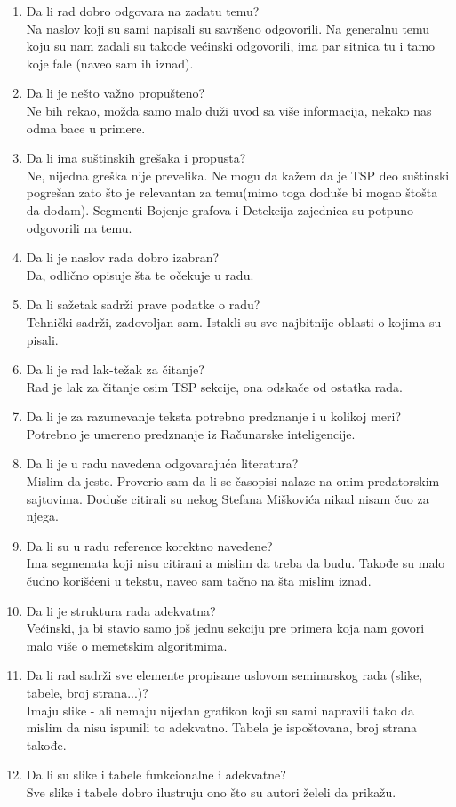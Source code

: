 \documentclass[a4paper]{report}
\begin{document}
\begin{enumerate}
\item Da li rad dobro odgovara na zadatu temu?\\ Na naslov koji su sami napisali su savršeno odgovorili. Na generalnu temu koju su nam zadali su takođe većinski odgovorili, ima par sitnica tu i tamo koje fale (naveo sam ih iznad).
\item Da li je nešto važno propušteno?\\ Ne bih rekao, možda samo malo duži uvod sa više informacija, nekako nas odma bace u primere.
\item Da li ima suštinskih grešaka i propusta?\\ Ne, nijedna greška nije prevelika. Ne mogu da kažem da je TSP deo suštinski pogrešan zato što je relevantan za temu(mimo toga doduše bi mogao štošta da dodam). Segmenti Bojenje grafova i Detekcija zajednica su potpuno odgovorili na temu.
\item Da li je naslov rada dobro izabran?\\ Da, odlično opisuje šta te očekuje u radu.
\item Da li sažetak sadrži prave podatke o radu?\\ Tehnički sadrži, zadovoljan sam. Istakli su sve najbitnije oblasti o kojima su pisali. 
\item Da li je rad lak-težak za čitanje?\\ Rad je lak za čitanje osim TSP sekcije, ona odskače od ostatka rada.
\item Da li je za razumevanje teksta potrebno predznanje i u kolikoj meri?\\ Potrebno je umereno predznanje iz Računarske inteligencije.
\item Da li je u radu navedena odgovarajuća literatura?\\ Mislim da jeste. Proverio sam da li se časopisi nalaze na onim predatorskim sajtovima. Doduše citirali su nekog Stefana Miškovića nikad nisam čuo za njega.
\item Da li su u radu reference korektno navedene?\\ Ima segmenata koji nisu citirani a mislim da treba da budu. Takođe su malo čudno korišćeni u tekstu, naveo sam tačno na šta mislim iznad.
\item Da li je struktura rada adekvatna?\\ Većinski, ja bi stavio samo još jednu sekciju pre primera koja nam govori malo više o memetskim algoritmima.
\item Da li rad sadrži sve elemente propisane uslovom seminarskog rada (slike, tabele, broj strana...)?\\ Imaju slike - ali nemaju nijedan grafikon koji su sami napravili tako da mislim da nisu ispunili to adekvatno. Tabela je ispoštovana, broj strana takođe.
\item Da li su slike i tabele funkcionalne i adekvatne?\\ Sve slike i tabele dobro ilustruju ono što su autori želeli da prikažu.
\end{enumerate}
\end{document}
